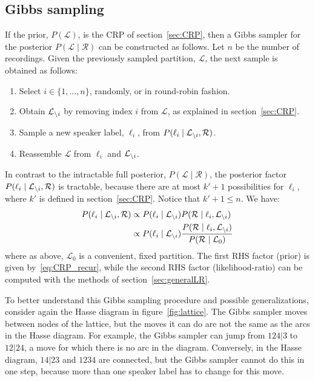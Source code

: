 \documentclass[a4paper,oneside,12pt,english]{report}
\def\Lset{\mathcal{L}}
\def\Rset{\mathcal{R}}
\def\Iset#1#2#3{\{#1_{#2}\}_{#2=1}^{#3}}
\begin{document}
\subsection{Gibbs sampling}
\def\LI{\Lset_{\setminus\Iset}}
\label{sec:Gibbs}
If the prior, $P(\Lset)$, is the CRP of section~\ref{sec:CRP}, then a Gibbs sampler for the posterior $P(\Lset\mid\Rset)$ can be constructed as follows. Let $n$ be the number of recordings. Given the previously sampled partition, $\Lset$, the next sample is obtained as follows:
\begin{enumerate}
	\item Select $i\in\{1,\ldots,n\}$, randomly, or in round-robin fashion.
	\item Obtain $\Li$ by removing index $i$ from $\Lset$, as explained in section~\ref{sec:CRP}.
	\item Sample a new speaker label, $\ell_i$, from  $P(\ell_i\mid\Li,\Rset)$.
	\item Reassemble $\Lset$ from $\ell_i$ and $\Li$.
\end{enumerate}
In contrast to the intractable full posterior, $P(\Lset\mid\Rset)$, the posterior factor $P(\ell_i\mid\Li,\Rset)$ is tractable, because there are at most $k'+1$ possibilities for $\ell_i$, where $k'$ is defined in section~\ref{sec:CRP}. Notice that $k'+1\le n$. We have:
\begin{align}
\label{eq:Gibbsfactor}
\begin{split}
P(\ell_i\mid\Li,\Rset) &\propto P(\ell_i\mid\Li) P(\Rset\mid\ell_i,\Li) \\
&\propto P(\ell_i\mid\Li) \frac{P(\Rset\mid\ell_i,\Li)}{P(\Rset\mid\Lset_0)} 
\end{split}
\end{align}  
where as above, $\Lset_0$ is a convenient, fixed partition. The first RHS factor (prior) is given by~\eqref{eq:CRP_recur}, while the second RHS factor (likelihood-ratio) can be computed with the methods of section~\ref{sec:generalLR}.

To better understand this Gibbs sampling procedure and possible generalizations, consider again the Hasse diagram in figure~\ref{fig:lattice}. The Gibbs sampler moves between nodes of the lattice, but the moves it can do are not the same as the arcs in the Hasse diagram. For example, the Gibbs sampler can jump from $124|3$ to $12|24$, a move for which there is no arc in the diagram. Conversely, in the Hasse diagram, $14|23$ and $1234$ are connected, but the Gibbs sampler cannot do this in one step, because more than one speaker label has to change for this move. 
\end{document}
